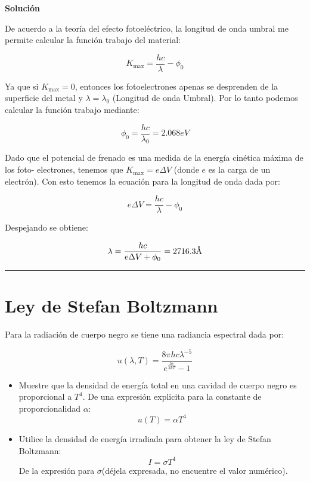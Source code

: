 \documentclass[12pt]{article}
\newcommand{\angstrom}{\mbox{\normalfont\AA}}
\begin{document}
\begin{center}
	\textbf{Solución}
\end{center}
De acuerdo a la teoría del efecto fotoeléctrico, la longitud de onda umbral me permite
calcular la función trabajo del material:

\begin{equation*}
K_{\text{max}} = \frac{hc}{\lambda} - \phi_0
\end{equation*}

Ya que si $K_{\text{max}} = 0$, entonces los fotoelectrones apenas se desprenden de la superficie del metal
y $\lambda = \lambda_0$ (Longitud de onda Umbral). Por lo tanto podemos calcular la función trabajo
mediante:

\begin{equation*}
\phi_0 = \frac{hc}{\lambda_0} = 2.068 eV
\end{equation*}


Dado que el potencial de frenado es una medida de la energía cinética máxima de los foto-
electrones, tenemos que $K_{\text{max}} = e\Delta V$ (donde $e$ es la carga de un electrón). Con esto tenemos la ecuación para la longitud de onda dada por:


\begin{equation*}
e\Delta V = \frac{hc}{\lambda}- \phi_0
\end{equation*}

Despejando se obtiene:

\begin{equation*}
\lambda = \frac{hc}{e\Delta V +\phi_0} = 2716.3  \angstrom
\end{equation*}
\noindent\rule{16.5cm}{0.4pt}


\section{Ley de Stefan Boltzmann}

	Para la radiación de cuerpo negro se tiene una radiancia espectral dada por:
	
	\begin{equation*}
	u(\lambda,T) = \frac{8\pi h c \lambda^{-5}}{e^{\frac{hc}{\lambda k T}}-1}
	\end{equation*}
	
	
	\begin{itemize}
		\item Muestre que la densidad de energía total en una cavidad de cuerpo negro es proporcional a
		$T^4$.
		De una expresión explicita para la constante de proporcionalidad $\alpha$:
		\begin{equation*}
		u(T) = \alpha T^ 4
		\end{equation*}
		\item Utilice la densidad de energía irradiada para obtener la ley de Stefan Boltzmann:
		$$I = \sigma T^4$$
		De la expresión para $\sigma$(déjela expresada, no encuentre el valor numérico). 
	\end{itemize}
\end{document}
